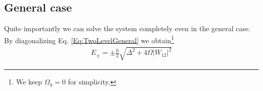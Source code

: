 \subsection{General case}

Quite importantly we can solve the system completely even in the general case. By diagonalizing  Eq. \eqref{Eq:TwoLevelGeneral} we obtain\footnote{We keep $\Omega_y =0$ for simplicity.}
\begin{align}\label{eq:Epm}
 E_\pm = \pm \frac{\hbar}{2} \sqrt{\Delta^2+4 \Omega\left|W_{12}\right|^2}
\end{align}